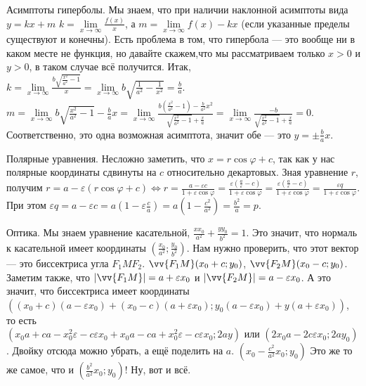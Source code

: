 \documentclass{article}
\let\vec\vv
\begin{document}
\begin{itemize}
\begin{Proof}
            \par Асимптоты гиперболы. Мы знаем, что при наличии наклонной асимптоты вида $y=kx+m$ $k=\lim\limits_{x\to\infty}\frac{f(x)}x$, а $m=\lim\limits_{x\to\infty}f(x)-kx$ (если указанные пределы существуют и конечны). Есть проблема в том, что гипербола --- это вообще ни в каком месте не функция, но давайте скажем,что мы рассматриваем только $x>0$ и $y>0$, в таком случае всё получится. Итак, $k=\lim\limits_{x\to\infty}\frac{b\sqrt{\frac{x^2}{a^2}-1}}x=\lim\limits_{x\to\infty}b\sqrt{\frac1{a^2}-\frac1{x^2}}=\frac ba$. $m=\lim\limits_{x\to\infty}b\sqrt{\frac{x^2}{a^2}-1}-\frac bax=\lim\limits_{x\to\infty}\frac{b\left(\frac{x^2}{a^2}-1\right)-\frac{b}{a^2}x^2}{\sqrt{\frac{x^2}{a^2}-1}+\frac xa}=\lim\limits_{x\to\infty}\frac{-b}{\sqrt{\frac{x^2}{a^2}-1}+\frac xa}=0$. Соответственно, это одна возможная асимптота, значит обе --- это $y=\pm\frac bax$.\\
            \par Полярные уравнения. Несложно заметить, что $x=r\cos\varphi+c$, так как у нас полярные координаты сдвинуты на $c$ относительно декартовых. Зная уравнение $r$, получим $r=a-\varepsilon(r\cos\varphi+c)\Leftrightarrow r=\frac{a-\varepsilon c}{1+\varepsilon\cos\varphi}=\frac{\varepsilon\left(\frac a\varepsilon-c\right)}{1+\varepsilon\cos\varphi}=\frac{\varepsilon\left(\frac a\varepsilon-c\right)}{1+\varepsilon\cos\varphi}=\frac{\varepsilon q}{1+\varepsilon\cos\varphi}$. При этом $\varepsilon q=a-\varepsilon c=a\left(1-\varepsilon\frac ca\right)=a\left(1-\frac{c^2}{a^2}\right)=\frac{b^2}a=p$.\\
            \par Оптика. Мы знаем уравнение касательной, $\frac{xx_0}{a^2}+\frac{yy_0}{b^2}=1$. Это значит, что нормаль к касательной имеет координаты $\left(\frac{x_0}{a^2};\frac{y_0}{b^2}\right)$. Нам нужно проверить, что этот вектор --- это биссектриса угла $F_1MF_2$. $\vec{F_1M}(x_0+c;y_0)$, $\vec{F_2M}(x_0-c;y_0)$. Заметим также, что $|\vec{F_1M}|=a+\varepsilon x_0$ и $|\vec{F_2M}|=a-\varepsilon x_0$. А это значит, что биссектриса имеет координаты\\$\left((x_0+c)(a-\varepsilon x_0)+(x_0-c)(a+\varepsilon x_0);y_0(a-\varepsilon x_0)+y(a+\varepsilon x_0)\right)$, то есть\\$\left(x_0a+ca-x_0^2\varepsilon-c\varepsilon x_0+x_0a-ca+x_0^2\varepsilon-c\varepsilon x_0;2ay\right)$ или $\left(2x_0a-2c\varepsilon x_0;2ay_0\right)$. Двойку отсюда можно убрать, а ещё поделить на $a$. $\left(x_0-\frac{c^2}{a^2}x_0;y_0\right)$ Это же то же самое, что и $\left(\frac{b^2}{a^2}x_0;y_0\right)$! Ну, вот и всё.
        \end{Proof}
    \end{itemize}
\end{document}
